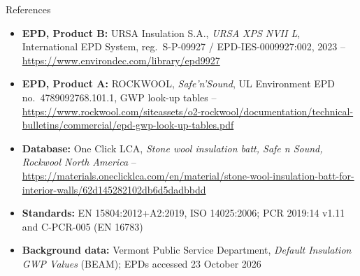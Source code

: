 \documentclass[11pt,aspectratio=43,ignorenonframetext,t]{beamer}
\begin{document}
\begin{frame}{References}
  \begin{itemize}
    \item \textbf{EPD, Product B:} URSA Insulation S.A., \emph{URSA XPS NVII L}, International EPD System, reg.\ S-P-09927 / EPD-IES-0009927:002, 2023 -- \url{https://www.environdec.com/library/epd9927}
    \item \textbf{EPD, Product A:} ROCKWOOL, \emph{Safe'n'Sound}, UL Environment EPD no.\ 4789092768.101.1, GWP look-up tables -- \url{https://www.rockwool.com/siteassets/o2-rockwool/documentation/technical-bulletins/commercial/epd-gwp-look-up-tables.pdf}
    \item \textbf{Database:} One Click LCA, \emph{Stone wool insulation batt, Safe n Sound, Rockwool North America} -- \url{https://materials.oneclicklca.com/en/material/stone-wool-insulation-batt-for-interior-walls/62d145282102db6d5dadbbdd}
    \item \textbf{Standards:} EN 15804:2012+A2:2019, ISO 14025:2006; PCR 2019:14 v1.11 and C-PCR-005 (EN 16783)
    \item \textbf{Background data:} Vermont Public Service Department, \emph{Default Insulation GWP Values} (BEAM); EPDs accessed 23 October 2026
  \end{itemize}

\end{frame}


\end{document}
